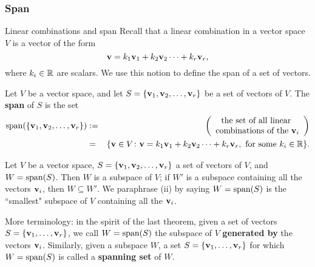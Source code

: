 \subsubsection*{Span}
\begin{frame}{Linear combinations and span}
Recall that a \alert{linear combination} in a vector space $V$ is a vector of the form 
\[
{\mathbf v}=k_1{\mathbf v}_1+k_2{\mathbf v}_2\cdots +k_r{\mathbf v}_r,
\] 
where $k_i\in {\mathbb R}$ are scalars. 
\bpause We use this notion to define the \alert{span} of a set of vectors. 
\begin{definition}
Let $V$ be a vector space, and let $S=\{{\mathbf v}_1,{\mathbf v}_2,\dots,{\mathbf v}_r\}$ be a set of vectors of $V$. The {\bf span} of $S$ is the set 
\begin{eqnarray*}
\operatorname{span}(\{{\mathbf v}_1,{\mathbf v}_2,\dots,{\mathbf v}_r\})&:=&\left(\begin{array}{c} \text{the set of all linear } \\ \text{combinations of the ${\mathbf v}_i$}\end{array}\right)\\
&=&\{{\mathbf v}\in V\colon {\mathbf v}=k_1{\mathbf v}_1+k_2{\mathbf v}_2\cdots +k_r{\mathbf v}_r, \text{ for some } k_i\in{\mathbb R} \}.
\end{eqnarray*}
\end{definition}
\end{frame}
\begin{frame}
\begin{theorem}
Let $V$ be a vector space,  $S=\{{\mathbf v}_1,{\mathbf v}_2,\dots,{\mathbf v}_r\}$ a set of vectors of $V$, and $W=\operatorname{span}(S)$. Then 
\bb[(i)]
\ii $W$ is a subspace of $V$;
\ii if $W'$ is a subspace containing all the vectors ${\mathbf v}_i$, then $W\subseteq W'$.
\ee
We paraphrase (ii) by saying $W=\operatorname{span}(S)$ is the ``smallest" subspace of $V$ containing all the ${\mathbf v}_i$. 
\end{theorem}
\pause
\alert{More terminology:} in the spirit of the last theorem, given a set of vectors $S=\{{\mathbf v}_1,\dots, {\mathbf v}_r\}$, we call $W=\operatorname{span}(S)$ the subspace of $V$ {\bf generated by} the vectors ${\mathbf v}_i$. Similarly, given a subspace $W$, a set $S=\{{\mathbf v}_1,\dots, {\mathbf v}_r\}$ for which $W=\operatorname{span}(S)$ is called a {\bf spanning set} of $W$. 
\end{frame}

